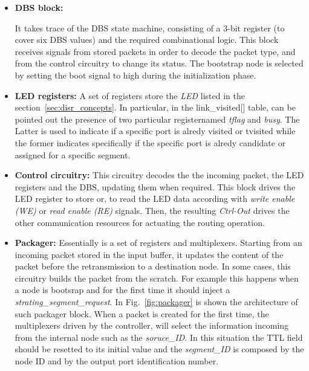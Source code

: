 \begin{itemize}

	\item \textbf{DBS block:}

	It takes trace of the DBS state machine,  consisting of a 3-bit
	register (to cover six DBS values) and the  required combinational
	logic. This block receives signals from  stored packets  in order
	to decode the packet type, and from  the control circuitry to
	change its status. The bootstrap node is selected by setting the
	boot signal to high during the initialization phase.

	\item \textbf{LED registers:}
	A set of registers store the \emph{LED} listed in the
	section~\ref{sec:disr_concepts}.  In particular, in the
	link\_visited[] table, can be pointed out the presence of two
	particular registernamed \emph{tflag} and \emph{busy}.  The Latter
	is used to indicate if a specific port is alredy visited or
	tvisited while the former indicates specifically if the specific
	port is alredy candidate or  assigned for a specific segment.

    \item \textbf{Control circuitry:}
    This circuitry decodes the the      incoming packet, the LED
	registers and the DBS,     updating them when required. This block
	drives the LED register   to store or, to read the LED data
	according with \emph{write enable (WE)} or \emph{read enable (RE)}
	signals. Then, the resulting \emph{Ctrl-Out} drives the other
	communication resources for actuating the \disr{} routing operation.

	\item \textbf{Packager:}
	Essentially is a set of registers and multiplexers. Starting from
	an incoming packet stored in the input buffer, it updates the
	content of the packet before the retransmission to   a destination
	node.  In some cases, this circuitry builds the packet from the
	scratch.  For example this happens when a node is bootsrap and for
	the first time it should inject a \emph{strating\_segment\_request}. 
	In Fig.~\ref{fig:packager} is shown the architecture of such packager 
	block. When a packet is created for the first time, the multiplexers 
	driven by the controller, will select the information incoming from the 
	internal node such as the \emph{soruce\_ID}. In this situation the 
	TTL field should be resetted to its initial value and the \emph{segment\_ID}
	is composed by the node ID and by the output port identification 
	number.

\end{itemize}

